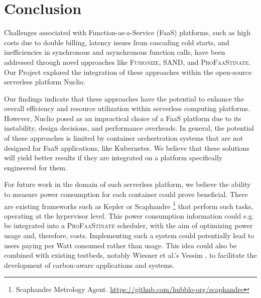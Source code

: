 \section{Conclusion}\label{sec:conclusion}

Challenges associated with Function-as-a-Service (FaaS) platforms, such as high
costs due to double billing, latency issues from cascading cold starts, and
inefficiencies in synchronous and asynchronous function calls, have been
addressed through novel approaches like \textsc{Fusionize}, SAND, and
\textsc{ProFaaStinate}. Our Project explored the integration of these approaches
within the open-source serverless platform Nuclio.

Our findings indicate that these approaches have the potential to enhance the
overall efficiency and resource utilization within serverless computing
platforms. However, Nuclio posed as an impractical choice of a FaaS platform due
to its instability, design decisions, and performance overheads. In general, the
potential of these approaches is limited by container orchestration systems that
are not designed for FaaS applications, like Kubernetes. We believe that these
solutions will yield better results if they are integrated on a platform
specifically engineered for them.


For future work in the domain of such serverless platform, we believe the
ability to measure power consumption for each container could prove beneficial.
There are existing frameworks such as Kepler \cite{amaral2023kepler} or
Scaphandre \footnote{Scaphandre Metrology Agent.
\url{https://github.com/hubblo-org/scaphandre}} that perform such tasks,
operating at the hypervisor level. This power consumption information could e.g.
be integrated into a \textsc{ProFaaStinate} scheduler, with the aim of
optimizing power usage and, therefore, costs. Implementing such a system could
potentially lead to users paying per Watt consumed rather than usage. This idea
could also be combined with existing testbeds, notably Wiesner et al.'s Vessim
\cite{wiesner2023sil}, to facilitate the development of carbon-aware
applications and systems.
